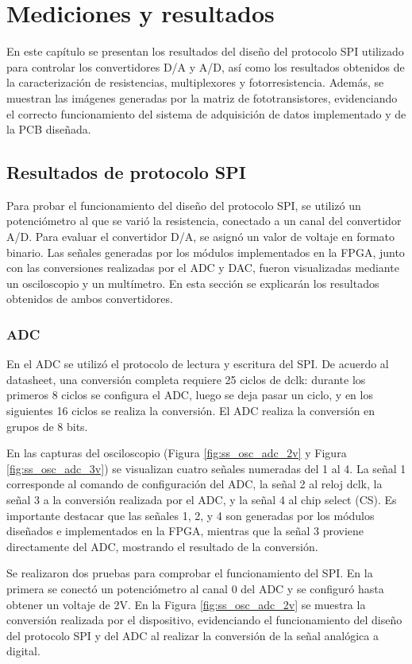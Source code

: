 \chapter{Mediciones y resultados}
En este capítulo se presentan los resultados del diseño del protocolo SPI utilizado para controlar los convertidores D/A y A/D, así como los resultados obtenidos de la caracterización de resistencias, multiplexores y fotorresistencia. Además, se muestran las imágenes generadas por la matriz de fototransistores, evidenciando el correcto funcionamiento del sistema de adquisición de datos implementado y de la PCB diseñada.


\section{Resultados de protocolo SPI}
Para probar el funcionamiento del diseño del protocolo SPI, se utilizó un potenciómetro al que se varió la resistencia, conectado a un canal del convertidor A/D. Para evaluar el convertidor D/A, se asignó un valor de voltaje en formato binario. Las señales generadas por los módulos implementados en la FPGA, junto con las conversiones realizadas por el ADC y DAC, fueron visualizadas mediante un osciloscopio y un multímetro. En esta sección se explicarán los resultados obtenidos de ambos convertidores.

\subsection{ADC}
En el ADC se utilizó el protocolo de lectura y escritura del SPI. De acuerdo al datasheet, una conversión completa requiere 25 ciclos de dclk: durante los primeros 8 ciclos se configura el ADC, luego se deja pasar un ciclo, y en los siguientes 16 ciclos se realiza la conversión. El ADC realiza la conversión en grupos de 8 bits.


En las capturas del osciloscopio (Figura \ref{fig:ss_osc_adc_2v} y Figura \ref{fig:ss_osc_adc_3v}) se visualizan cuatro señales numeradas del 1 al 4. La señal 1 corresponde al comando de configuración del ADC, la señal 2 al reloj dclk, la señal 3 a la conversión realizada por el ADC, y la señal 4 al chip select (CS). Es importante destacar que las señales 1, 2, y 4 son generadas por los módulos diseñados e implementados en la FPGA, mientras que la señal 3 proviene directamente del ADC, mostrando el resultado de la conversión.


Se realizaron dos pruebas para comprobar el funcionamiento del SPI. En la primera se conectó un potenciómetro al canal 0 del ADC y se configuró hasta obtener un voltaje de 2V. En la Figura \ref{fig:ss_osc_adc_2v} se muestra la conversión realizada por el dispositivo, evidenciando el funcionamiento del diseño del protocolo SPI y del ADC al realizar la conversión de la señal analógica a digital.


